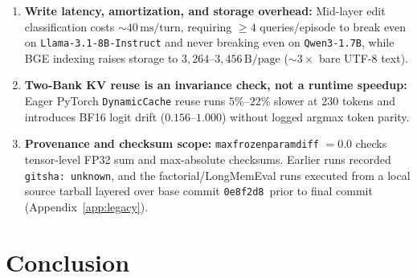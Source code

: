 \documentclass[10pt]{article}
\renewcommand{\_}{\origunderscore\allowbreak}
\begin{document}
\begin{enumerate}
    \item \textbf{Write latency, amortization, and storage overhead:} Mid-layer edit classification costs $\sim 40\,\text{ms/turn}$, requiring $\ge 4$ queries/episode to break even on \texttt{Llama-3.1-8B-Instruct} and never breaking even on \texttt{Qwen3-1.7B}, while BGE indexing raises storage to $3{,}264$--$3{,}456\,\text{B/page}$ ($\sim 3\times$ bare UTF-8 text).
    \item \textbf{Two-Bank KV reuse is an invariance check, not a runtime speedup:} Eager PyTorch \texttt{DynamicCache} reuse runs $5\%$--$22\%$ slower at $230$ tokens and introduces BF16 logit drift ($0.156$--$1.000$) without logged argmax token parity.
    \item \textbf{Provenance and checksum scope:} \texttt{max\_frozen\_param\_diff} $=0.0$ checks tensor-level FP32 sum and max-absolute checksums. Earlier runs recorded \texttt{git\_sha: unknown}, and the factorial/LongMemEval runs executed from a local source tarball layered over base commit \texttt{0e8f2d8}\ prior to final commit (Appendix~\ref{app:legacy}).
\end{enumerate}

\section{Conclusion}
\label{sec:conclusion}
\end{document}

